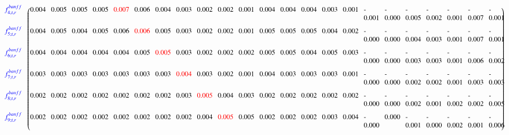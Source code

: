 {\begin{sideways}
\begin{minipage}{23cm}
{\begin{equation*}
\begin{blockarray}{c p{18pt}p{18pt}p{18pt}p{18pt}p{18pt}p{18pt}p{18pt}p{18pt}p{18pt}p{18pt}p{18pt}p{18pt}p{18pt}p{18pt}p{18pt}p{18pt}p{18pt}p{18pt}p{18pt}p{18pt}p{18pt}p{18pt}p{18pt}}
\begin{block}{c(p{18pt}p{18pt}p{18pt}p{18pt}p{18pt}p{18pt}p{18pt}p{18pt}p{18pt}p{18pt}p{18pt}p{18pt}p{18pt}p{18pt}p{18pt}p{18pt}p{18pt}p{18pt}p{18pt}p{18pt}p{18pt}p{18pt}p{18pt}@{\hspace*{1pt}})}
{\color{blue} f_{4; t, r}^{banff}}  \vspace{0.2cm} &      0.004 &      0.005 &      0.005 &      0.005 & {\color{red} 0.007} &      0.006 &      0.004 &      0.003 &      0.002 &      0.002 &      0.001 &      0.004 &      0.004 &      0.004 &      0.003 &      0.001 &     -0.001 &     -0.000 &     -0.005 &     -0.002 &     -0.001 &     -0.007 &     -0.001 \\ 
{\color{blue} f_{5; t, r}^{banff}}  \vspace{0.2cm} &      0.004 &      0.005 &      0.004 &      0.005 &      0.006 & {\color{red} 0.006} &      0.005 &      0.003 &      0.002 &      0.002 &      0.001 &      0.005 &      0.005 &      0.005 &      0.004 &      0.002 &     -0.000 &     -0.000 &     -0.004 &     -0.003 &     -0.001 &     -0.007 &     -0.001 \\ 
{\color{blue} f_{6; t, r}^{banff}}  \vspace{0.2cm} &      0.004 &      0.004 &      0.004 &      0.004 &      0.004 &      0.005 & {\color{red} 0.005} &      0.003 &      0.002 &      0.002 &      0.002 &      0.005 &      0.005 &      0.004 &      0.005 &      0.003 &     -0.000 &     -0.000 &     -0.003 &     -0.003 &     -0.001 &     -0.006 &     -0.002 \\ 
{\color{blue} f_{7; t, r}^{banff}}  \vspace{0.2cm} &      0.003 &      0.003 &      0.003 &      0.003 &      0.003 &      0.003 &      0.003 & {\color{red} 0.004} &      0.003 &      0.002 &      0.001 &      0.004 &      0.003 &      0.003 &      0.003 &      0.001 &     -0.000 &     -0.000 &     -0.002 &     -0.002 &     -0.001 &     -0.003 &     -0.003 \\ 
{\color{blue} f_{8; t, r}^{banff}}  \vspace{0.2cm} &      0.002 &      0.002 &      0.002 &      0.002 &      0.002 &      0.002 &      0.002 &      0.003 & {\color{red} 0.005} &      0.004 &      0.003 &      0.002 &      0.002 &      0.002 &      0.002 &      0.002 &     -0.000 &     -0.000 &     -0.002 &     -0.001 &     -0.002 &     -0.002 &     -0.005 \\ 
{\color{blue} f_{9; t, r}^{banff}}  \vspace{0.2cm} &      0.002 &      0.002 &      0.002 &      0.002 &      0.002 &      0.002 &      0.002 &      0.002 &      0.004 & {\color{red} 0.005} &      0.005 &      0.002 &      0.002 &      0.002 &      0.003 &      0.004 &     -0.000 &      0.000 &     -0.001 &     -0.000 &     -0.002 &     -0.001 &     -0.006 \\ 

\end{block}
\end{blockarray}
\end{equation*}}
\end{minipage}
\end{sideways}}

